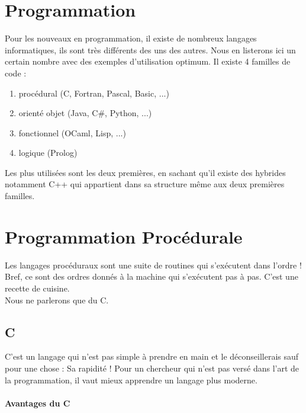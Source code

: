 \section{Programmation}

Pour les nouveaux en programmation, il existe de nombreux langages informatiques, ils sont très 
différents des uns des autres. Nous en listerons ici un certain nombre avec des exemples d'utilisation 
optimum. 
Il existe 4 familles de code : %

\begin{enumerate}
\item procédural (C, Fortran, Pascal, Basic, ...)
\item orienté objet (Java, C\#, Python, ...)
\item fonctionnel (OCaml, Lisp, ...)
\item logique (Prolog)
\end{enumerate}

Les plus utilisées sont les deux premières, en sachant qu'il existe des hybrides notamment C++ 
qui appartient dans sa structure même aux deux premières familles. 

\section{Programmation Procédurale}

Les langages procéduraux sont une suite de routines qui s'exécutent dans l'ordre ! Bref, ce sont des ordres 
donnés à la machine qui s'exécutent pas à pas. C'est une recette de cuisine.\\

Nous ne parlerons que du C. 

\subsection{C}

C'est un langage qui n'est pas simple à prendre en main et le déconseillerais sauf pour 
une chose : Sa rapidité ! Pour un chercheur qui n'est pas versé dans l'art de la programmation,
il vaut mieux apprendre un langage plus moderne.

\paragraph{Avantages du C}

